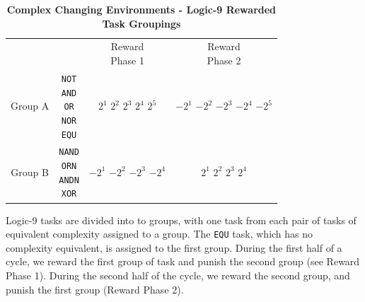 \documentclass[PhD]{msu-thesis}
\begin{document}
	\begin{table}[]
	\centering
	\caption{\textbf{Complex Changing Environments - Logic-9 Rewarded Task Groupings}}
	\label{lte-complex-treatments-logic9-h}

	\begin{tabular}{|c|c|c|c|}
	\hline
	 & \thead{Tasks} & \thead{Reward \\ Phase 1} & \thead{Reward \\ Phase 2} \\\hhline{|=|=|=|=|}
	 Group A & \makecell{ \texttt{NOT} \\ \texttt{AND} \\ \texttt{OR} \\ \texttt{NOR} \\ \texttt{EQU} } & \makecell{ $2^1$ \\ $2^2$ \\ $2^3$ \\ $2^4$ \\ $2^5$ } & \makecell{ $-2^{1}$ \\ $-2^{2}$ \\ $-2^{3}$ \\ $-2^{4}$ \\ $-2^{5}$ } \\\hline
	 Group B & \makecell{ \texttt{NAND} \\ \texttt{ORN} \\ \texttt{ANDN} \\ \texttt{XOR} } & \makecell{ $-2^{1}$ \\ $-2^{2}$ \\ $-2^{3}$ \\ $-2^{4}$ } & \makecell{ $2^1$ \\ $2^2$ \\ $2^3$ \\ $2^4$ } \\\hline
	\end{tabular} 

	\begin{flushleft}Logic-9 tasks are divided into to groups, with one task from each pair of tasks of equivalent complexity assigned to a group. The \texttt{EQU} task, which has no complexity equivalent, is assigned to the first group. During the first half of a cycle, we reward the first group of task and punish the second group (see Reward Phase 1). During the second half of the cycle, we reward the second group, and punish the first group (Reward Phase 2).  
	\end{flushleft}
	\label{lte-complex-treatments-logic9}
	\end{table}
\end{document}
